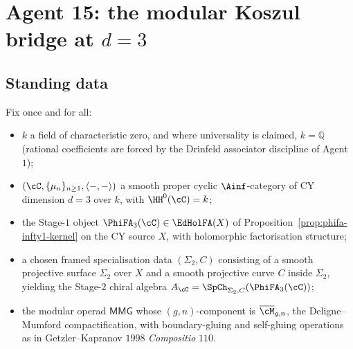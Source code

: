%
%
%

\chapter*{Agent 15: the modular Koszul bridge at $d = 3$}

\section*{Standing data}

Fix once and for all:

\begin{itemize}
\item $k$ a field of characteristic zero, and where universality is
claimed, $k = \mathbb{Q}$ (rational coefficients are forced by the
Drinfeld associator discipline of Agent~$1$);
\item $(\cC, \{\mu_n\}_{n \geq 1}, \langle -, - \rangle)$ a smooth
proper cyclic $\Ainf$-category of CY dimension $d = 3$ over $k$, with
$\HH^0(\cC) = k$;
\item the Stage-$1$ object $\PhiFA_3(\cC) \in \EdHolFA(X)$ of
Proposition~\ref{prop:phifa-infty1-kernel} on the CY source $X$, with
holomorphic factorisation structure;
\item a chosen framed specialisation data $(\Sigma_2, C)$ consisting of
a smooth projective surface $\Sigma_2$ over $X$ and a smooth projective
curve $C$ inside $\Sigma_2$, yielding the Stage-$2$ chiral algebra
$A_\cC = \SpCh_{\Sigma_2, C}(\PhiFA_3(\cC))$;
\item the modular operad $\mathsf{MMG}$ whose $(g, n)$-component is
$\overline{\cM}_{g, n}$, the Deligne--Mumford compactification, with
boundary-gluing and self-gluing operations as in Getzler--Kapranov
$1998$ \emph{Compositio} $110$.
\end{itemize}

